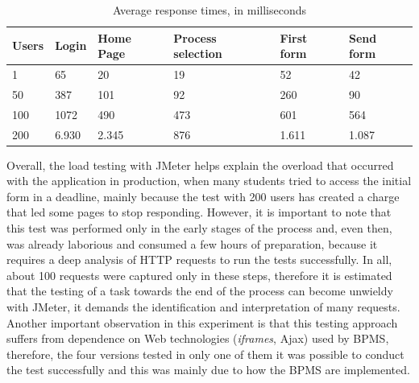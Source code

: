 \documentclass[runningheads,a4paper]{llncs}
\begin{document}

\begin{table}
{\scriptsize
\centering
\begin{tabular}{p{2cm}|p{2cm}|p{2cm}|p{2cm}|p{2cm}|p{2cm}}
\hline
Users & Login & Home Page & Process selection & First form & Send form\\\hline
1 & 65 & 20 & 19 & 52 & 42\\\hline
50 & 387 & 101 & 92 & 260 & 90\\\hline
100 & 1072 & 490 & 473 & 601 & 564\\\hline
200 & 6.930 & 2.345 & 876 & 1.611 & 1.087\\\hline
\end{tabular}
}
\caption{Average response times, in milliseconds}
\label{tab:resultadoCarga}
\end{table}

Overall, the load testing with JMeter helps explain the overload that occurred with the application in production, when many students tried to access the initial form in a deadline, mainly because the test with 200 users has created a charge that led some pages to stop responding. However, it is important to note that this test was performed only in the early stages of the process and, even then, was already laborious and consumed a few hours of preparation, because it requires a deep analysis of HTTP requests to run the tests successfully. In all, about 100 requests were captured only in these steps, therefore it is estimated that the testing of a task towards the end of the process can become unwieldy with JMeter, it demands the identification and interpretation of many requests. Another important observation in this experiment is that this testing approach suffers from dependence on Web technologies (\emph{iframes}, Ajax) used by BPMS, therefore, the four versions tested in only one of them it was possible to conduct the test successfully and this was mainly due to how the BPMS are implemented.
\end{document}
